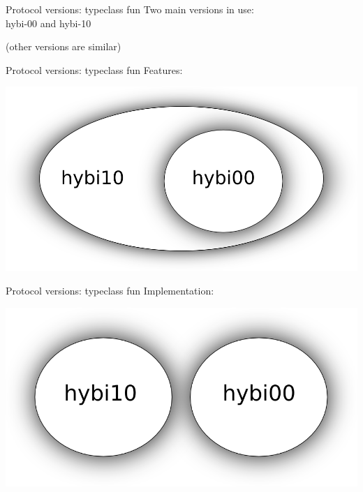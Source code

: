 \documentclass[20pt]{beamer}
\newcommand{\vspaced}{
    \vspace{5mm}
}
\begin{document}
\begin{frame}{Protocol versions: typeclass fun}
    Two main versions in use: \\
    hybi-00 and hybi-10 \\
    \vspaced
    \small{(other versions are similar)} \\
\end{frame}

\begin{frame}{Protocol versions: typeclass fun}
    Features:
    \begin{center}
    \includegraphics[width=\textwidth]{images/features.png}
    \end{center}
\end{frame}

\begin{frame}{Protocol versions: typeclass fun}
    Implementation:
    \begin{center}
    \includegraphics[width=\textwidth]{images/implementation.png}
    \end{center}
\end{frame}




\end{document}
